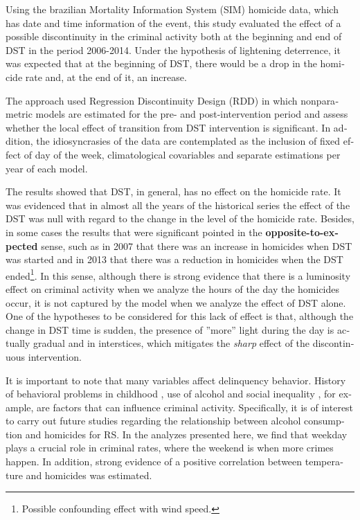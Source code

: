 \documentclass[12pt,openright,oneside,a4paper,english,french,spanish]{abntex2}
\numberwithin{table}{section} %
\numberwithin{figure}{section} %
\begin{document}
\begin{otherlanguage}{english}
Using the brazilian Mortality Information System (SIM) homicide data, which has date and time information of the event, this study evaluated the effect of a possible discontinuity in the criminal activity both at the beginning and end of DST in the period 2006-2014. Under the hypothesis of lightening deterrence, it was expected that at the beginning of DST, there would be a drop in the homicide rate and, at the end of it, an increase.

The approach used Regression Discontinuity Design (RDD) in which nonparametric models are estimated for the pre- and post-intervention period and assess whether the local effect of transition from DST intervention is significant. In addition, the idiosyncrasies of the data are contemplated as the inclusion of fixed effect of day of the week, climatological covariables and separate estimations per year of each model.

The results showed that DST, in general, has no effect on the homicide rate. It was evidenced that in almost all the years of the historical series the effect of the DST was null with regard to the change in the level of the homicide rate. Besides, in some cases the results that were significant pointed in the \textbf{opposite-to-expected} sense, such as in 2007 that there was an increase in homicides when DST was started and in 2013 that there was a reduction in homicides when the DST ended\footnote{Possible confounding effect with wind speed.}. In this sense, although there is strong evidence that there is a luminosity effect on criminal activity when we analyze the hours of the day the homicides occur, it is not captured by the model when we analyze the effect of DST alone. One of the hypotheses to be considered for this lack of effect is that, although the change in DST time is sudden, the presence of ''more'' light during the day is actually gradual and in interstices, which mitigates the \textit{sharp} effect of the discontinuous intervention.

It is important to note that many variables affect delinquency behavior. History of behavioral problems in childhood \cite{murray2015childhood}, use of alcohol \cite{mcbride1991prediction, dearden2009alcohol} and social inequality \cite{kelly2000inequality,fajnzylber2002inequality}, for example, are factors that can influence criminal activity. Specifically, it is of interest to carry out future studies regarding the relationship between alcohol consumption and homicides for RS. In the analyzes presented here, we find that weekday plays a crucial role in criminal rates, where the weekend is when more crimes happen. In addition, strong evidence of a positive correlation between temperature and homicides was estimated.


\end{otherlanguage}
\end{document}
